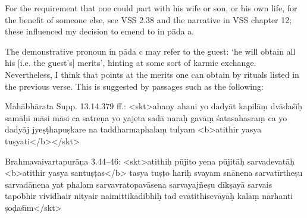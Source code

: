 { For the requirement that one could part with his wife or son, or his own life,                 for the benefit of someone else, see VSS 2.38 and the narrative in VSS chapter 12;                 these influenced my decision to emend  to  in pāda a. }















{ The demonstrative pronoun  in pāda c may refer to the guest:               `he will obtain all his [i.e. the guest's] merits', hinting at some sort of karmic exchange.                 Nevertheless, I think that  points at the merits one can obtain by rituals listed                  in the previous verse. This is suggested by passages such as the following:                 

                 Mahābhārata Supp. 13.14.379 ff.:
                    <skt>ahany ahani yo dadyāt kapilāṃ dvādaśīḥ samāḥi\danda
                         māsi māsi ca satreṇa yo yajeta sadā naraḥ\twodanda 
                         gavāṃ śatasahasraṃ ca yo dadyāj jyeṣṭhapuṣkare\danda 
                         na taddharmaphalaṃ tulyam <b>atithir yasya tuṣyati</b>\twodanda</skt>                 

                  Brahmavaivartapurāṇa 3.44--46:
                    <skt>atithiḥ pūjito yena pūjitāḥ sarvadevatāḥ\danda
                         <b>atithir yasya santuṣṭas</b> tasya tuṣṭo hariḥ svayam\twodanda
                         snānena sarvatīrtheṣu sarvadānena yat phalam\danda
                           sarvavratopavāsena sarvayajñeṣu dīkṣayā\twodanda 
                         sarvais tapobhir vividhair nityair naimittikādibhiḥ\danda  
                         tad evātithisevāyāḥ kalāṃ nārhanti ṣoḍaśīm\twodanda</skt>           }





